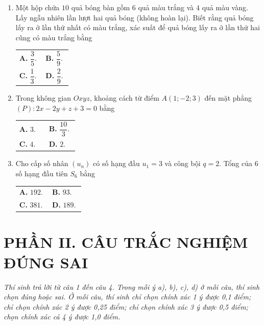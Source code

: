 \documentclass[12pt,a4paper]{article}
\makeatletter
\newcommand{\bonpa}[4]{\par\smallskip\noindent
\begin{tabular}{@{}p{0.47\linewidth}p{0.47\linewidth}@{}}
\textbf{A.} #1 & \textbf{B.} #2\\[3pt]
\textbf{C.} #3 & \textbf{D.} #4\end{tabular}}
\makeatother
\begin{document}
\begin{enumerate}
\item Một hộp chứa $10$ quả bóng bàn gồm $6$ quả màu trắng và $4$ quả màu vàng. Lấy ngẫu nhiên lần lượt hai quả bóng (không hoàn lại). Biết rằng quả bóng lấy ra ở lần thứ nhất có màu trắng, xác suất để quả bóng lấy ra ở lần thứ hai cũng có màu trắng bằng
\bonpa{$\dfrac{3}{5}$.}{$\dfrac{5}{9}$.}{$\dfrac{1}{3}$.}{$\dfrac{2}{9}$.}

\item Trong không gian $Oxyz$, khoảng cách từ điểm $A(1; -2; 3)$ đến mặt phẳng $(P): 2x - 2y + z + 3 = 0$ bằng
\bonpa{$3$.}{$\dfrac{10}{3}$.}{$4$.}{$2$.}

\item Cho cấp số nhân $(u_n)$ có số hạng đầu $u_1 = 3$ và công bội $q = 2$. Tổng của $6$ số hạng đầu tiên $S_6$ bằng
\bonpa{$192$.}{$93$.}{$381$.}{$189$.}
\end{enumerate}

\newpage
\section*{\large PHẦN II. CÂU TRẮC NGHIỆM ĐÚNG SAI}
\textit{Thí sinh trả lời từ câu 1 đến câu 4. Trong mỗi ý a), b), c), d) ở mỗi câu, thí sinh chọn đúng hoặc sai. Ở mỗi câu, thí sinh chỉ chọn chính xác 1 ý được 0,1 điểm; chỉ chọn chính xác 2 ý được 0,25 điểm; chỉ chọn chính xác 3 ý được 0,5 điểm; chọn chính xác cả 4 ý được 1,0 điểm.}
\end{document}
